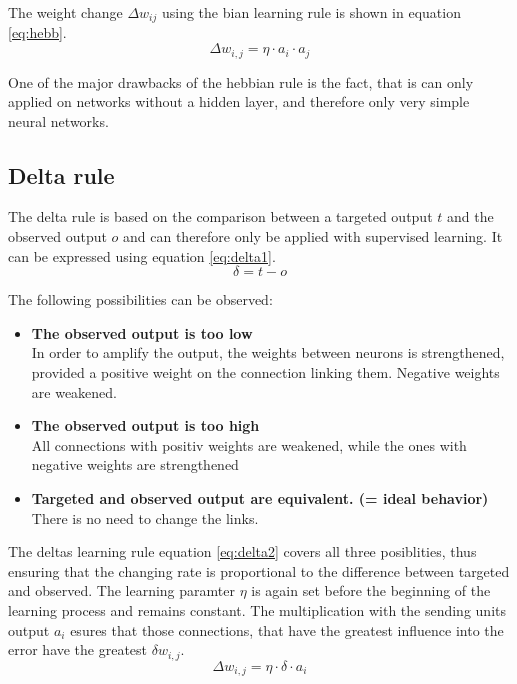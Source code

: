 \documentclass[10pt,a4paper,DIV=11]{scrreprt}
\begin{document}
The weight change $\Delta w_{ij}$ using the bian learning rule is shown in equation \eqref{eq:hebb}.
\begin{equation}
\Delta w_{i,j} = \eta \cdot a_i \cdot a_j
\label{eq:hebb}
\end{equation}

One of the major drawbacks of the hebbian rule is the fact, that is can only applied on networks without a hidden layer, and therefore only very simple neural networks.

\subsection{Delta rule}
The delta rule is based on the comparison between a targeted output $t$ and the observed output $o$ and can therefore only be applied with supervised learning.
It can be expressed using equation \eqref{eq:delta1}.
\begin{equation}
\delta = t - o
\label{eq:delta1}
\end{equation}

The following possibilities can be observed:
\begin{itemize}
\item \textbf{The observed output is too low}\\
In order to amplify the output, the weights between neurons is strengthened, provided a positive weight on the connection linking them. Negative weights are weakened.
\item \textbf{The observed output is too high}\\
All connections with positiv weights are weakened, while the ones with negative weights are strengthened 
\item \textbf{Targeted and observed output are equivalent. (= ideal behavior)}\\ There is no need to change the links.
\end{itemize}

The deltas learning rule equation \eqref{eq:delta2} covers all three posiblities, thus ensuring that the changing rate is proportional to the difference between targeted and observed. The learning paramter $\eta$ is again set before the beginning of the learning process and remains constant. The multiplication with the sending units output $a_i$ esures that those connections, that have the greatest influence into the error have the greatest $\delta w_{i,j}$.
\begin{equation}
\Delta w_{i,j} = \eta \cdot \delta \cdot a_i
\label{eq:delta2}
\end{equation}
\end{document}
